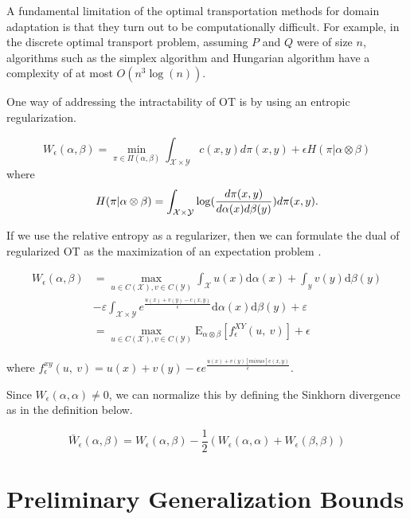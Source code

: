 A fundamental limitation of the optimal transportation methods for domain adaptation is that they turn out to be computationally difficult. For example, in the discrete optimal transport problem, assuming $P$ and $Q$ were of size $n$, algorithms such as the simplex algorithm and Hungarian algorithm have a complexity of at most $O(n^3 \log(n))$.

One way of addressing the intractability of OT is by using an entropic regularization.

\begin{definition}
	$$W_{\epsilon}(\alpha,\beta) = \min_{\pi \in \Pi(\alpha,\beta)} \int_{\mathcal{X}\times \mathcal{Y}} c(x,y)d\pi(x,y) + \epsilon H(\pi | \alpha \otimes \beta)$$
	where $$H(\pi | \alpha \otimes \beta) = \int_{\mathcal{X}\times \mathcal{Y}} \log (\frac{d\pi(x,y)}{d\alpha(x)d\beta(y)})d\pi(x,y).$$
\end{definition}

If we use the relative entropy as a regularizer, then we can formulate the dual of regularized OT as the maximization of an expectation problem \cite{Genevay2018}.

\begin{align*}
	W_{\epsilon}(\alpha,\beta) &=\max_{u\in C(\mathcal{X}),v\in C(\mathcal{Y})}\int_{\mathcal{X}} u(x)\mathrm{d}\alpha(x)+\int_{y}v(y)\mathrm{d}\beta(y) \\
	&-\varepsilon \int_{\mathcal{X}\times \mathcal{Y}} e^{\frac{u(x)+v(y)-c(x,y)}{\epsilon}}\mathrm{d}\alpha(x)\mathrm{d}\beta(y) + \varepsilon\\
	&= \max_{u\in C(\mathcal{X}),v\in C(\mathcal{Y})} \mathrm{E}_{\alpha \otimes \beta} [f_{\epsilon}^{XY}(u,\ v)]+\epsilon
\end{align*}


where $f_{\epsilon}^{xy}(u,\ v)=u(x)+v(y)- \epsilon e^{\frac{u(x)+v(y)[minus]\mathrm{c}(x,y)}{\epsilon}}.$

Since $W_{\epsilon}(\alpha,\alpha)\neq 0$, we can normalize this by defining the Sinkhorn divergence as in the definition below.
\begin{definition}
	\[
	\bar{W}_{\epsilon}(\alpha,\beta)=W_{\epsilon}(\alpha,\beta)-\frac{1}{2}(W_{\epsilon}(\alpha,\alpha)+W_{\epsilon}(\beta,\beta))
	\] 
\end{definition}

\section{Preliminary Generalization Bounds}
\label{generalization-bounds}

